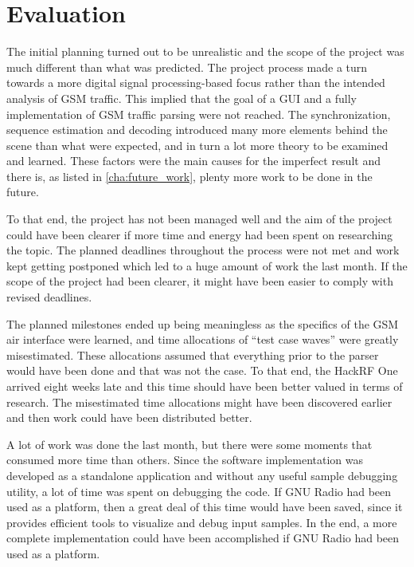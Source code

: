 \section{Evaluation}
The initial planning turned out to be unrealistic and the scope of the
project was much different than what was predicted. The project
process made a turn towards a more digital signal processing-based
focus rather than the intended analysis of \gls{GSM} traffic. This
implied that the goal of a \gls{GUI} and a fully implementation of
\gls{GSM} traffic parsing were not reached. The synchronization,
sequence estimation and decoding introduced many more elements behind
the scene than what were expected, and in turn a lot more theory to be
examined and learned. These factors were the main causes for the
imperfect result and there is, as listed in \cref{cha:future_work},
plenty more work to be done in the future.

To that end, the project has not been managed well and the aim of the
project could have been clearer if more time and energy had been spent
on researching the topic. The planned deadlines throughout the process
were not met and work kept getting postponed which led to a huge
amount of work the last month. If the scope of the project had been
clearer, it might have been easier to comply with revised deadlines.

The planned milestones ended up being meaningless as the specifics of
the \gls{GSM} air interface were learned, and time allocations of
``test case waves'' were greatly misestimated. These allocations
assumed that everything prior to the parser would have been done and
that was not the case. To that end, the HackRF One arrived eight weeks
late and this time should have been better valued in terms of
research. The misestimated time allocations might have been discovered
earlier and then work could have been distributed better.

A lot of work was done the last month, but there were some moments
that consumed more time than others. Since the software implementation
was developed as a standalone application and without any useful
sample debugging utility, a lot of time was spent on debugging the
code. If GNU Radio had been used as a platform, then a great deal of
this time would have been saved, since it provides efficient tools to
visualize and debug input samples. In the end, a more complete
implementation could have been accomplished if GNU Radio had been used
as a platform.
